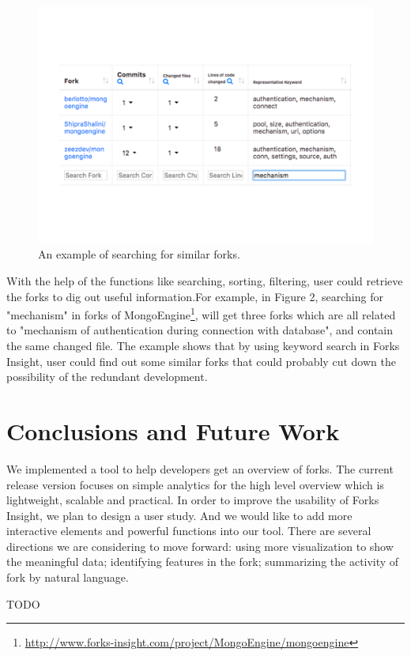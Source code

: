 \begin{figure}[]
\centering
\includegraphics[scale=0.3]{pic5.pdf}
\caption{An example of searching for similar forks.}
\vspace{-12pt}
\end{figure}

With the help of the functions like searching, sorting, filtering, user could retrieve the forks to dig out useful information.For example, in Figure 2, searching for "mechanism" in forks of MongoEngine\footnote{\url{http://www.forks-insight.com/project/MongoEngine/mongoengine}}, will get three forks which are all related to "mechanism of authentication during connection with database", and contain the same changed file. The example shows that by using keyword search in Forks Insight, user could find out some similar forks that could probably cut down the possibility of the redundant development.

\section{Conclusions and Future Work}
We implemented a tool to help developers get an overview of forks. The current release version focuses on simple analytics for the high level overview which is lightweight, scalable and practical. In order to improve the usability of Forks Insight, we plan to design a user study. And we would like to add more interactive elements and powerful functions into our tool. There are several directions we are considering to move forward: using more visualization to show the meaningful data; identifying features in the fork; summarizing the activity of fork by natural language.

\begin{acks}
  TODO
\end{acks}


